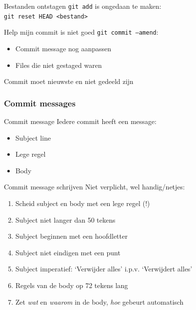 \begin{frame}{Bestanden ontstagen}
	\texttt{git add} is ongedaan te maken:\\
	\texttt{git reset HEAD <bestand>}
\end{frame}

\begin{frame}{Help mijn commit is niet goed}
	\texttt{git commit --amend}:
	\begin{itemize}
		\item Commit message nog aanpassen
		\item Files die niet gestaged waren
	\end{itemize}
	\alert{Commit moet nieuwste en niet gedeeld zijn}
\end{frame}

\subsubsection{Commit messages}
\begin{frame}{Commit message}
	Iedere commit heeft een message:
	\begin{itemize}
		\item Subject line
		\item Lege regel
		\item Body
	\end{itemize}
\end{frame}

\begin{frame}{Commit message schrijven}
	Niet verplicht, wel handig/netjes:
	\begin{enumerate}
		\item Scheid subject en body met een lege regel (!)
		\item Subject niet langer dan 50 tekens
		\item Subject beginnen met een hoofdletter
		\item Subject niet eindigen met een punt
		\item Subject imperatief: `Verwijder alles' i.p.v. `Verwijdert alles'
		\item Regels van de body op 72 tekens lang
		\item Zet \emph{wat} en \emph{waarom} in de body, \emph{hoe} gebeurt automatisch
	\end{enumerate}
\end{frame}

